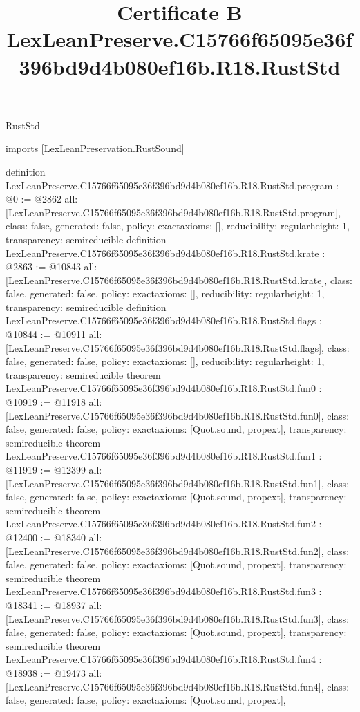 \begin{lexlean}{RustStd}
\title{Certificate B LexLeanPreserve.C15766f65095e36f396bd9d4b080ef16b.R18.RustStd}
\begin{coremodule}
imports [LexLeanPreservation.RustSound]

definition LexLeanPreserve.C15766f65095e36f396bd9d4b080ef16b.R18.RustStd.program : @0 := @2862 {
  all: [LexLeanPreserve.C15766f65095e36f396bd9d4b080ef16b.R18.RustStd.program],
  class: false,
  generated: false,
  policy: exact{axioms: []},
  reducibility: regular{height: 1},
  transparency: semireducible
}
definition LexLeanPreserve.C15766f65095e36f396bd9d4b080ef16b.R18.RustStd.krate : @2863 := @10843 {
  all: [LexLeanPreserve.C15766f65095e36f396bd9d4b080ef16b.R18.RustStd.krate],
  class: false,
  generated: false,
  policy: exact{axioms: []},
  reducibility: regular{height: 1},
  transparency: semireducible
}
definition LexLeanPreserve.C15766f65095e36f396bd9d4b080ef16b.R18.RustStd.flags : @10844 := @10911 {
  all: [LexLeanPreserve.C15766f65095e36f396bd9d4b080ef16b.R18.RustStd.flags],
  class: false,
  generated: false,
  policy: exact{axioms: []},
  reducibility: regular{height: 1},
  transparency: semireducible
}
theorem LexLeanPreserve.C15766f65095e36f396bd9d4b080ef16b.R18.RustStd.fun0 : @10919 := @11918 {
  all: [LexLeanPreserve.C15766f65095e36f396bd9d4b080ef16b.R18.RustStd.fun0],
  class: false,
  generated: false,
  policy: exact{axioms: [Quot.sound, propext]},
  transparency: semireducible
}
theorem LexLeanPreserve.C15766f65095e36f396bd9d4b080ef16b.R18.RustStd.fun1 : @11919 := @12399 {
  all: [LexLeanPreserve.C15766f65095e36f396bd9d4b080ef16b.R18.RustStd.fun1],
  class: false,
  generated: false,
  policy: exact{axioms: [Quot.sound, propext]},
  transparency: semireducible
}
theorem LexLeanPreserve.C15766f65095e36f396bd9d4b080ef16b.R18.RustStd.fun2 : @12400 := @18340 {
  all: [LexLeanPreserve.C15766f65095e36f396bd9d4b080ef16b.R18.RustStd.fun2],
  class: false,
  generated: false,
  policy: exact{axioms: [Quot.sound, propext]},
  transparency: semireducible
}
theorem LexLeanPreserve.C15766f65095e36f396bd9d4b080ef16b.R18.RustStd.fun3 : @18341 := @18937 {
  all: [LexLeanPreserve.C15766f65095e36f396bd9d4b080ef16b.R18.RustStd.fun3],
  class: false,
  generated: false,
  policy: exact{axioms: [Quot.sound, propext]},
  transparency: semireducible
}
theorem LexLeanPreserve.C15766f65095e36f396bd9d4b080ef16b.R18.RustStd.fun4 : @18938 := @19473 {
  all: [LexLeanPreserve.C15766f65095e36f396bd9d4b080ef16b.R18.RustStd.fun4],
  class: false,
  generated: false,
  policy: exact{axioms: [Quot.sound, propext]},
}
\end{coremodule}
\end{lexlean}

